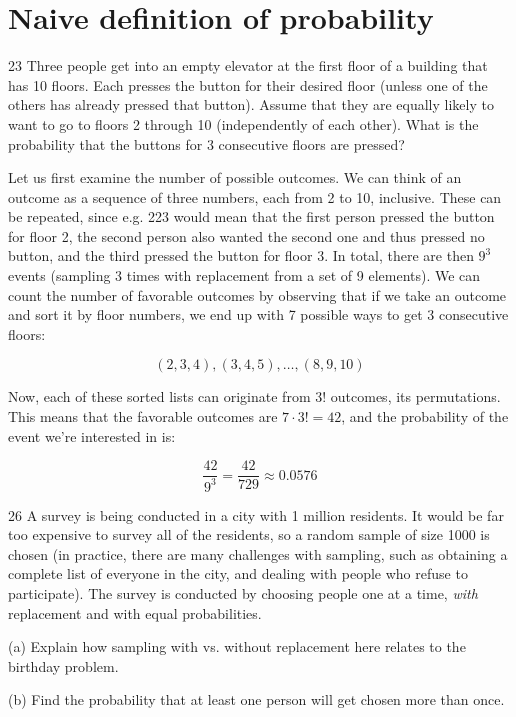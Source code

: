 \section{Naive definition of probability}

\begin{exercise}{23}
    Three people get into an empty elevator at the first floor of a building that has 10 floors.
    Each presses the button for their desired floor (unless one of the others has already pressed that button).
    Assume that they are equally likely to want to go to floors 2 through 10 (independently of each other).
    What is the probability that the buttons for 3 consecutive floors are pressed?
\end{exercise}

\begin{solution}
    
    Let us first examine the number of possible outcomes.
    We can think of an outcome as a sequence of three numbers, each from 2 to 10, inclusive.
    These can be repeated, since e.g. 223 would mean that the first person pressed the button for floor 2, the second person also wanted the second one and thus pressed no button, and the third pressed the button for floor 3.
    In total, there are then $9^3$ events (sampling 3 times with replacement from a set of 9 elements).
    We can count the number of favorable outcomes by observing that if we take an outcome and sort it by floor numbers, we end up with 7 possible ways to get 3 consecutive floors:

    \[(2, 3, 4), (3, 4, 5), \ldots, (8, 9, 10)\]

    Now, each of these sorted lists can originate from $3!$ outcomes, its permutations.
    This means that the favorable outcomes are $7 \cdot 3! = 42$, and the probability of the event we're interested in is:

    \[\frac{42}{9^3} = \frac{42}{729} \approx 0.0576\]

\end{solution}

\newpage

\begin{exercise}{26}
    A survey is being conducted in a city with 1 million residents.
    It would be far too expensive to survey all of the residents, so a random sample of size 1000 is chosen (in practice, there are many challenges with sampling, such as obtaining a complete list of everyone in the city, and dealing with people who refuse to participate).
    The survey is conducted by choosing people one at a time, \textit{with} replacement and with equal probabilities.

    (a) Explain how sampling with vs. without replacement here relates to the birthday problem.

    (b) Find the probability that at least one person will get chosen more than once.
\end{exercise}

